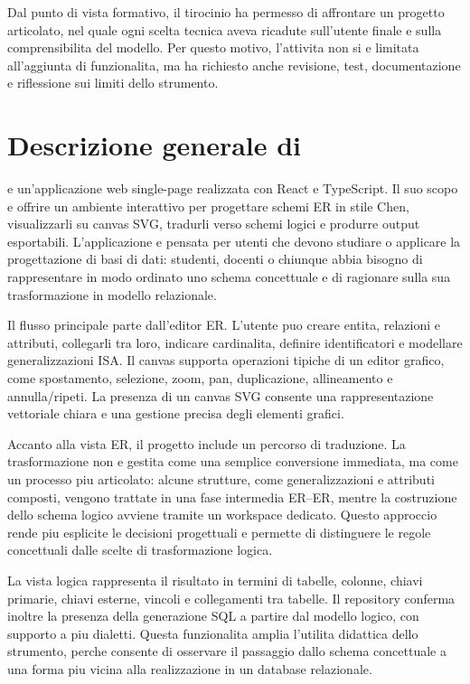 Dal punto di vista formativo, il tirocinio ha permesso di affrontare un progetto articolato, nel quale ogni scelta tecnica aveva ricadute sull'utente finale e sulla comprensibilita del modello. Per questo motivo, l'attivita non si e limitata all'aggiunta di funzionalita, ma ha richiesto anche revisione, test, documentazione e riflessione sui limiti dello strumento.

\section{Descrizione generale di \builder}

\builder{} e un'applicazione web single-page realizzata con React e TypeScript. Il suo scopo e offrire un ambiente interattivo per progettare schemi ER in stile Chen, visualizzarli su canvas SVG, tradurli verso schemi logici e produrre output esportabili. L'applicazione e pensata per utenti che devono studiare o applicare la progettazione di basi di dati: studenti, docenti o chiunque abbia bisogno di rappresentare in modo ordinato uno schema concettuale e di ragionare sulla sua trasformazione in modello relazionale.

Il flusso principale parte dall'editor ER. L'utente puo creare entita, relazioni e attributi, collegarli tra loro, indicare cardinalita, definire identificatori e modellare generalizzazioni ISA. Il canvas supporta operazioni tipiche di un editor grafico, come spostamento, selezione, zoom, pan, duplicazione, allineamento e annulla/ripeti. La presenza di un canvas SVG consente una rappresentazione vettoriale chiara e una gestione precisa degli elementi grafici.

Accanto alla vista ER, il progetto include un percorso di traduzione. La trasformazione non e gestita come una semplice conversione immediata, ma come un processo piu articolato: alcune strutture, come generalizzazioni e attributi composti, vengono trattate in una fase intermedia ER--ER, mentre la costruzione dello schema logico avviene tramite un workspace dedicato. Questo approccio rende piu esplicite le decisioni progettuali e permette di distinguere le regole concettuali dalle scelte di trasformazione logica.

La vista logica rappresenta il risultato in termini di tabelle, colonne, chiavi primarie, chiavi esterne, vincoli e collegamenti tra tabelle. Il repository conferma inoltre la presenza della generazione SQL a partire dal modello logico, con supporto a piu dialetti. Questa funzionalita amplia l'utilita didattica dello strumento, perche consente di osservare il passaggio dallo schema concettuale a una forma piu vicina alla realizzazione in un database relazionale.

